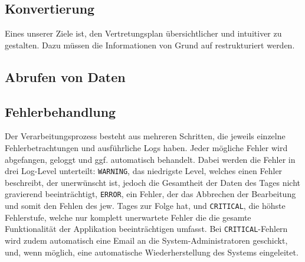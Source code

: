 \subsection{Konvertierung}
Eines unserer Ziele ist, den Vertretungsplan übersichtlicher und intuitiver zu gestalten. Dazu müssen
die Informationen von Grund auf restrukturiert werden. 

\subsection{Abrufen von Daten}

\subsection{Fehlerbehandlung}
Der Verarbeitungsprozess besteht aus mehreren Schritten, die jeweils einzelne Fehlerbetrachtungen
und ausführliche Logs haben. Jeder mögliche Fehler wird abgefangen, geloggt und ggf. automatisch 
behandelt. Dabei werden die Fehler in drei Log-Level unterteilt: \texttt{WARNING}, das niedrigste Level,
welches einen Fehler beschreibt, der unerwünscht ist, jedoch die Gesamtheit der Daten des Tages
nicht gravierend beeinträchtigt, \texttt{ERROR}, ein Fehler, der das Abbrechen der Bearbeitung und somit
den Fehlen des jew. Tages zur Folge hat, und \texttt{CRITICAL}, die höhste Fehlerstufe, welche nur komplett
unerwartete Fehler die die gesamte Funktionalität der Applikation beeinträchtigen umfasst.
Bei \texttt{CRITICAL}-Fehlern wird zudem automatisch eine Email an die System-Administratoren geschickt,
und, wenn möglich, eine automatische Wiederherstellung des Systems eingeleitet.
